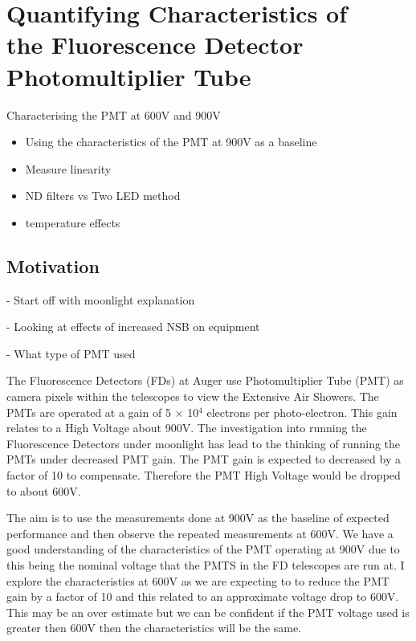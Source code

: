 \chapter[Quantifying Characteristics of the FD PMT]{\centering Quantifying Characteristics of \\ the Fluorescence Detector \\ Photomultiplier Tube \\}\label{Ch:PMTCharacter}


Characterising the PMT at 600V and 900V
\begin{itemize}
\item Using the characteristics of the PMT at 900V as a baseline
\item Measure linearity
\item ND filters vs Two LED method
\item temperature effects
\end{itemize}

\section{Motivation}

- Start off with moonlight explanation

- Looking at effects of increased NSB on equipment

- What type of PMT used

The Fluorescence Detectors (FDs) at Auger use Photomultiplier Tube (PMT) as camera pixels within the telescopes to view the Extensive Air Showers. The PMTs are operated at a gain of 5 $\times$ 10$^4$ electrons per photo-electron. This gain relates to a High Voltage about 900V. The investigation into running the Fluorescence Detectors under moonlight has lead to the thinking of running the PMTs under decreased PMT gain. The PMT gain is expected to decreased by a factor of 10 to compensate. Therefore the PMT High Voltage would be dropped to about 600V.

The aim is to use the measurements done at 900V as the baseline of expected performance and then observe the repeated measurements at 600V. We have a good  understanding of the characteristics of the PMT operating at 900V due to this being the nominal voltage that the PMTS in the FD telescopes are run at. I explore the characteristics at 600V as we are expecting to to reduce the PMT gain by a factor of 10 and this related to an approximate voltage drop to 600V. This may be an over estimate but we can be confident if the PMT voltage used is greater then 600V then the characteristics will be the same.

